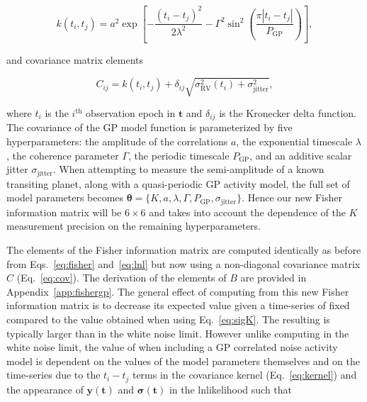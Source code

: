 \begin{equation}
  k(t_i,t_j) = a^2 \exp{\left[ -\frac{(t_i-t_j)^2}{2 \lambda^2}
      -\Gamma^2 \sin^2{\left(\frac{\pi |t_i-t_j|}{P_{\text{GP}}} \right)} \right]},
  \label{eq:kernel}
\end{equation}

\noindent and covariance matrix elements

\begin{equation}
  C_{ij} = k(t_i,t_j) + \delta_{ij} \sqrt{\sigma_{\text{RV}}^2(t_i) + \sigma_{\text{jitter}}^2},
  \label{eq:cov}
\end{equation}

\noindent where $t_i$ is the $i^{\text{th}}$ observation epoch in $\mathbf{t}$ and
$\delta_{ij}$ is the Kronecker delta function. The covariance of the GP model function is parameterized
by five hyperparameters: the amplitude of the correlations $a$, the exponential timescale $\lambda$,
the coherence parameter $\Gamma$, the periodic timescale $P_{\text{GP}}$, and an additive scalar jitter
$\sigma_{\text{jitter}}$.
When attempting to measure the semi-amplitude of a known transiting planet, along with a quasi-periodic GP
activity model, the full set of model parameters becomes
$\boldsymbol{\theta} = \{K, a, \lambda, \Gamma, P_{\text{GP}}, \sigma_{\text{jitter}} \}$. Hence our new Fisher
information matrix will be $6 \times 6$ and takes into account the dependence of the $K$
measurement precision on the remaining hyperparameters. 

The elements of the Fisher information matrix are computed identically as before from Eqs.~\ref{eq:fisher}
and~\ref{eq:lnl} but now using a non-diagonal covariance matrix $C$ (Eq.~\ref{eq:cov}). The derivation
of the elements of $B$ are provided in Appendix~\ref{app:fishergp}. The general effect of computing \sigK{}
from this new Fisher information matrix is to decrease its expected value given a time-series of fixed
\nrv{} compared to the value obtained when using
Eq.~\ref{eq:sigK}. The resulting \nrv{} is typically larger than in the white noise limit.
However unlike computing \sigK{} in the white noise limit, the value of \sigK{} when including a
GP correlated noise activity model is dependent on the values of the model parameters themselves
and on the time-series due to the $t_i-t_j$ terms in the covariance kernel (Eq.~\ref{eq:kernel})
and the appearance of $\mathbf{y}(\mathbf{t})$ and
$\boldsymbol{\sigma}(\mathbf{t})$ in the lnlikelihood such that

